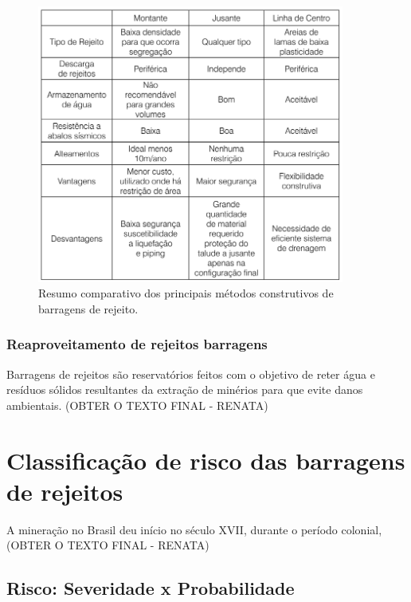 \begin{figure}[!htb]
    \centering
    \includegraphics[width=0.9\textwidth]{figures/image18_metodos_construtivos.png}
    \caption{Resumo comparativo dos principais métodos construtivos de barragens de rejeito.}
    \label{fig:metodos_construtivos}
\end{figure}

\subsubsection{Reaproveitamento de rejeitos barragens}
\label{subsubsec:reaproveitamento}

Barragens de rejeitos são reservatórios feitos com o objetivo de reter
água e resíduos sólidos resultantes da extração de minérios para que
evite danos ambientais. (OBTER O TEXTO FINAL - RENATA)

\section{Classificação de risco das barragens de rejeitos}
\label{sec:classificacao_risco}

A mineração no Brasil deu início no século XVII, durante o período
colonial, (OBTER O TEXTO FINAL - RENATA)

\subsection{Risco: Severidade x Probabilidade}
\label{subsec:risco}

